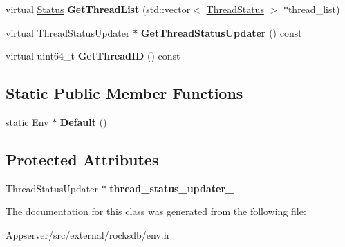 \begin{DoxyCompactItemize}
\item 
virtual \hyperlink{classrocksdb_1_1Status}{Status} {\bfseries Get\+Thread\+List} (std\+::vector$<$ \hyperlink{structrocksdb_1_1ThreadStatus}{Thread\+Status} $>$ $\ast$thread\+\_\+list)\hypertarget{classrocksdb_1_1Env_a0e571896f474014b4b325901d750ab23}{}\label{classrocksdb_1_1Env_a0e571896f474014b4b325901d750ab23}

\item 
virtual Thread\+Status\+Updater $\ast$ {\bfseries Get\+Thread\+Status\+Updater} () const\hypertarget{classrocksdb_1_1Env_a1477a743c80bcd2b8ea4f74282e6cdbd}{}\label{classrocksdb_1_1Env_a1477a743c80bcd2b8ea4f74282e6cdbd}

\item 
virtual uint64\+\_\+t {\bfseries Get\+Thread\+ID} () const\hypertarget{classrocksdb_1_1Env_a5586254cf1fcb2841eba41a22aff7818}{}\label{classrocksdb_1_1Env_a5586254cf1fcb2841eba41a22aff7818}

\end{DoxyCompactItemize}
\subsection*{Static Public Member Functions}
\begin{DoxyCompactItemize}
\item 
static \hyperlink{classrocksdb_1_1Env}{Env} $\ast$ {\bfseries Default} ()\hypertarget{classrocksdb_1_1Env_abb20c38f65f272a895a7b809606939d9}{}\label{classrocksdb_1_1Env_abb20c38f65f272a895a7b809606939d9}

\end{DoxyCompactItemize}
\subsection*{Protected Attributes}
\begin{DoxyCompactItemize}
\item 
Thread\+Status\+Updater $\ast$ {\bfseries thread\+\_\+status\+\_\+updater\+\_\+}\hypertarget{classrocksdb_1_1Env_a348855afa44cb4be60336af867c421aa}{}\label{classrocksdb_1_1Env_a348855afa44cb4be60336af867c421aa}

\end{DoxyCompactItemize}


The documentation for this class was generated from the following file\+:\begin{DoxyCompactItemize}
\item 
Appserver/src/external/rocksdb/env.\+h\end{DoxyCompactItemize}
